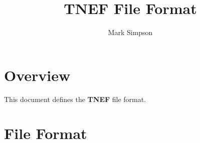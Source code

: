 \documentclass{article}
\title{TNEF File Format}
\author{Mark Simpson}
\begin{document}
\maketitle
\newcommand{\obj}[1]{\textsf{\textsl{#1}}}
\newcommand{\literal}[1]{\textsf{\textbf{#1}}}
\newcommand{\expl}[1]{\small{\textsf{\textsc{#1}}}}
\newcommand{\code}[1]{\literal{#1}}

\section{Overview}
This document defines the {\bf TNEF} file format.

\section{File Format}
\end{document}
